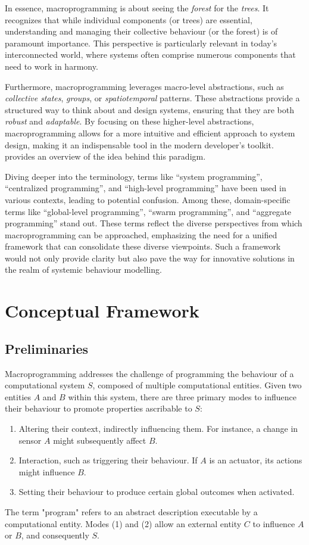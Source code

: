 In essence, macroprogramming is about seeing the \emph{forest} for the \emph{trees}. 
 It recognizes that while individual components (or trees) are essential,
 understanding and managing their collective behaviour (or the forest) is of paramount importance. 
This perspective is particularly relevant in today's interconnected world, 
 where systems often comprise numerous components that need to work in harmony.

Furthermore, macroprogramming leverages macro-level abstractions, 
 such as \emph{collective states}, \emph{groups}, or \emph{spatiotemporal} patterns. 
 These abstractions provide a structured way to think about and design systems, ensuring that they are both \emph{robust} and \emph{adaptable}. 
By focusing on these higher-level abstractions, 
 macroprogramming allows for a more intuitive and efficient approach to system design, 
 making it an indispensable tool in the modern developer's toolkit.
 provides an overview of the idea behind this paradigm.

Diving deeper into the terminology, 
 terms like ``system programming'', ``centralized programming'', and ``high-level programming'' 
 have been used in various contexts, leading to potential confusion. 
% 
Among these, domain-specific terms like ``global-level programming'', ``swarm programming'', and 
 ``aggregate programming'' stand out. 
%
These terms reflect the diverse perspectives from which macroprogramming can be approached, 
 emphasizing the need for a unified framework that can consolidate these diverse viewpoints. 
%
Such a framework would not only provide clarity but also pave the way for innovative solutions in the realm of systemic behaviour modelling.

\section{Conceptual Framework}

\subsection{Preliminaries}
Macroprogramming addresses the challenge of programming the behaviour of a computational system \( S \), composed of multiple computational entities. Given two entities \( A \) and \( B \) within this system, there are three primary modes to influence their behaviour to promote properties ascribable to \( S \):
\begin{enumerate}
    \item Altering their context, indirectly influencing them. For instance, a change in sensor \( A \) might subsequently affect \( B \).
    \item Interaction, such as triggering their behaviour. If \( A \) is an actuator, its actions might influence \( B \).
    \item Setting their behaviour to produce certain global outcomes when activated.
\end{enumerate}
The term "program" refers to an abstract description executable by a computational entity. Modes (1) and (2) allow an external entity \( C \) to influence \( A \) or \( B \), and consequently \( S \).


